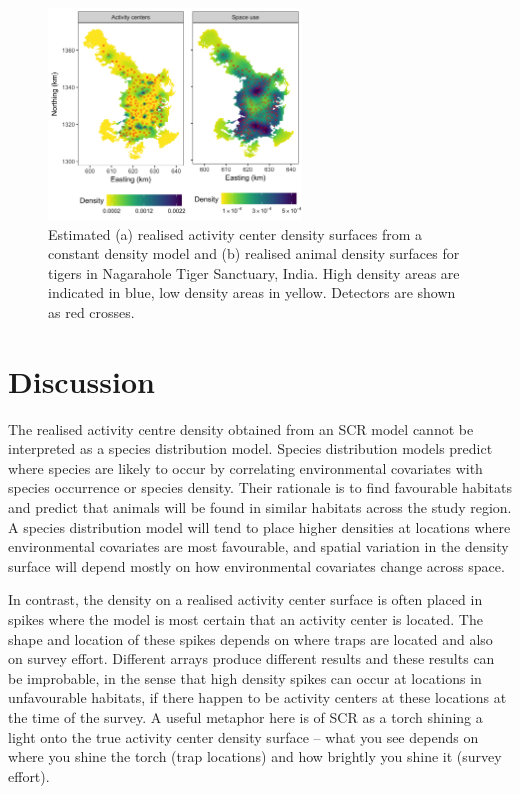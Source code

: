 \documentclass[10pt,a4paper]{article}
\begin{document}
\begin{figure}[htbp]
\centering
\includegraphics[width=0.6\textwidth]{tiger_spaceuse.png}
\caption{Estimated (a) realised activity center density surfaces from a constant density model and (b) realised animal density surfaces for tigers in Nagarahole Tiger Sanctuary, India. High density areas are indicated in blue, low density areas in yellow. Detectors are shown as red crosses.}
\label{tigerspaceuse}
\end{figure}


\section{Discussion} \label{discussion}
The realised activity centre density obtained from an SCR model cannot be interpreted as a species distribution model. Species distribution models predict where species are likely to occur by correlating environmental covariates with species occurrence or species density. Their rationale is to find favourable habitats and predict that animals will be found in similar habitats across the study region. A species distribution model will tend to place higher densities at locations where environmental covariates are most favourable, and spatial variation in the density surface will depend mostly on how environmental covariates change across space.

In contrast, the density on a realised activity center surface is often placed in spikes where the model is most certain that an activity center is located. The shape and location of these spikes depends on where traps are located and also on survey effort. Different arrays produce different results and these results can be improbable, in the sense that high density spikes can occur at locations in unfavourable habitats, if there happen to be activity centers at these locations at the time of the survey. A useful metaphor here is of SCR as a torch shining a light onto the true activity center density surface -- what you see depends on where you shine the torch (trap locations) and how brightly you shine it (survey effort). 
\end{document}
